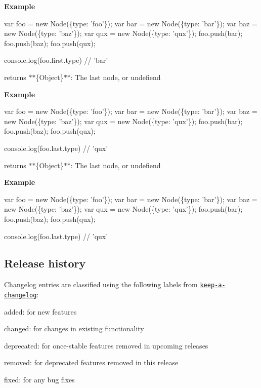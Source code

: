 {\bfseries Example}


\begin{DoxyCode}
var foo = new Node(\{type: 'foo'\});
var bar = new Node(\{type: 'bar'\});
var baz = new Node(\{type: 'baz'\});
var qux = new Node(\{type: 'qux'\});
foo.push(bar);
foo.push(baz);
foo.push(qux);

console.log(foo.first.type) // 'bar'
\end{DoxyCode}



\begin{DoxyItemize}
\item {\ttfamily returns} $\ast$$\ast$\{Object\}$\ast$$\ast$\+: The last node, or undefiend
\end{DoxyItemize}

{\bfseries Example}


\begin{DoxyCode}
var foo = new Node(\{type: 'foo'\});
var bar = new Node(\{type: 'bar'\});
var baz = new Node(\{type: 'baz'\});
var qux = new Node(\{type: 'qux'\});
foo.push(bar);
foo.push(baz);
foo.push(qux);

console.log(foo.last.type) // 'qux'
\end{DoxyCode}



\begin{DoxyItemize}
\item {\ttfamily returns} $\ast$$\ast$\{Object\}$\ast$$\ast$\+: The last node, or undefiend
\end{DoxyItemize}

{\bfseries Example}


\begin{DoxyCode}
var foo = new Node(\{type: 'foo'\});
var bar = new Node(\{type: 'bar'\});
var baz = new Node(\{type: 'baz'\});
var qux = new Node(\{type: 'qux'\});
foo.push(bar);
foo.push(baz);
foo.push(qux);

console.log(foo.last.type) // 'qux'
\end{DoxyCode}


\subsection*{Release history}

Changelog entries are classified using the following labels from \href{https://github.com/olivierlacan/keep-a-changelog}{\tt keep-\/a-\/changelog}\+:


\begin{DoxyItemize}
\item {\ttfamily added}\+: for new features
\item {\ttfamily changed}\+: for changes in existing functionality
\item {\ttfamily deprecated}\+: for once-\/stable features removed in upcoming releases
\item {\ttfamily removed}\+: for deprecated features removed in this release
\item {\ttfamily fixed}\+: for any bug fixes
\end{DoxyItemize}

